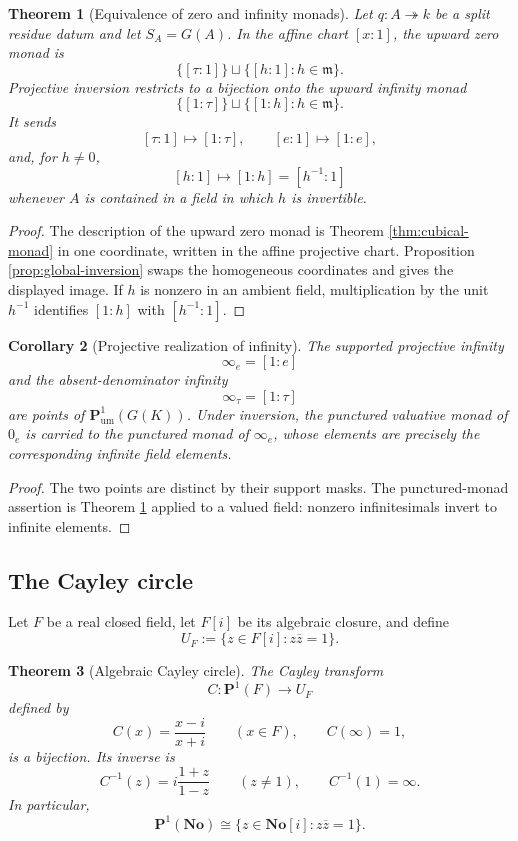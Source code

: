 \documentclass[11pt]{amsart}
\numberwithin{equation}{section}
\newtheorem{theorem}{Theorem}[section]
\newtheorem{corollary}[theorem]{Corollary}
\theoremstyle{definition}
\newcommand{\No}{\mathbf{No}}
\newcommand{\Pum}{\mathbf P_{\mathrm{um}}}
\begin{document}
\begin{theorem}[Equivalence of zero and infinity monads]\label{thm:zero-infinity-monads}
Let $q:A\twoheadrightarrow k$ be a split residue datum and let $S_A=G(A)$.  In the affine chart $[x:1]$, the upward zero monad is
\[
\{[\tau:1]\}
\sqcup
\{[h:1]:h\in\mathfrak m\}.
\]
Projective inversion restricts to a bijection onto the upward infinity monad
\[
\{[1:\tau]\}
\sqcup
\{[1:h]:h\in\mathfrak m\}.
\]
It sends
\[
[\tau:1]\mapsto[1:\tau],
\qquad
[e:1]\mapsto[1:e],
\]
and, for $h\neq0$,
\[
[h:1]\mapsto[1:h]=[h^{-1}:1]
\]
whenever $A$ is contained in a field in which $h$ is invertible.
\end{theorem}

\begin{proof}
The description of the upward zero monad is Theorem \ref{thm:cubical-monad} in one coordinate, written in the affine projective chart.  Proposition \ref{prop:global-inversion} swaps the homogeneous coordinates and gives the displayed image.  If $h$ is nonzero in an ambient field, multiplication by the unit $h^{-1}$ identifies $[1:h]$ with $[h^{-1}:1]$.
\end{proof}

\begin{corollary}[Projective realization of infinity]\label{cor:no-x-infinity}
The supported projective infinity
\[
\infty_e=[1:e]
\]
and the absent-denominator infinity
\[
\infty_\tau=[1:\tau]
\]
are points of $\Pum^1(G(K))$.  Under inversion, the punctured valuative monad of $0_e$ is carried to the punctured monad of $\infty_e$, whose elements are precisely the corresponding infinite field elements.
\end{corollary}

\begin{proof}
The two points are distinct by their support masks.  The punctured-monad assertion is Theorem \ref{thm:zero-infinity-monads} applied to a valued field: nonzero infinitesimals invert to infinite elements.
\end{proof}

\subsection{The Cayley circle}

Let $F$ be a real closed field, let $F[i]$ be its algebraic closure, and define
\[
U_F:=\{z\in F[i]:z\overline z=1\}.
\]

\begin{theorem}[Algebraic Cayley circle]\label{thm:cayley-circle}
The Cayley transform
\[
C:\mathbf P^1(F)\longrightarrow U_F
\]
defined by
\[
C(x)=\frac{x-i}{x+i}
\qquad(x\in F),
\qquad
C(\infty)=1,
\]
is a bijection.  Its inverse is
\[
C^{-1}(z)=i\frac{1+z}{1-z}
\qquad(z\neq1),
\qquad
C^{-1}(1)=\infty.
\]
In particular,
\[
\mathbf P^1(\No)
\cong
\{z\in\No[i]:z\overline z=1\}.
\]
\end{theorem}
\end{document}
